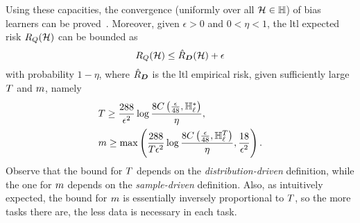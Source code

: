 Using these capacities, the convergence (uniformly over all $\mathcal{H} \in \mathbb{H}$) of bias learners can be proved~\cite[Theorem~2]{baxter2000model}. Moreover, given $\epsilon > 0$ and $0 < \eta < 1$, the \acrshort{ltl} expected risk $R_Q(\mathcal{H})$ can be bounded as
\begin{equation}
    \nonumber
    R_Q(\mathcal{H}) \leq \hat{R}_{\bm{D}}(\mathcal{H}) + \epsilon
\end{equation}
with probability $1 - \eta$, where $\hat{R}_{\bm{D}}$ is the \acrshort{ltl} empirical risk, given sufficiently large $T$ and $m$, namely
\begin{equation}
    \nonumber
    \begin{aligned}
        &T \geq \frac{288}{\epsilon^2} \log{\frac{8C\left(\frac{\epsilon}{48}, \mathbb{H}^{*}_\ell\right)}{\eta}} , \\
        &m \geq \max \left( \frac{288}{T \epsilon^2} \log\frac{8C\left(\frac{\epsilon}{48}, \mathbb{H}^{T}_\ell\right)}{\eta} , \frac{18}{\epsilon^2}\right) . 
    \end{aligned}
\end{equation}
Observe that the bound for $T$ depends on the \emph{distribution-driven} definition, while the one for $m$ depends on the \emph{sample-driven} definition.
Also, as intuitively expected, the bound for $m$ is essentially inversely proportional to $T$, so the more tasks there are, the less data is necessary in each task. 

